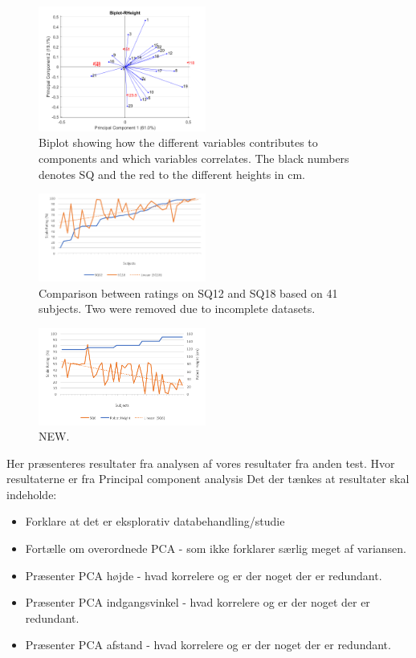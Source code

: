 \noindent
%
%
\begin{figure}[H]
	\centering
	\includegraphics[width = 0.49\textwidth]{Figure/RHeight-Biplot.png}
	\setlength{} 
	\caption{Biplot showing how the different variables contributes to components and which variables correlates. The black numbers denotes SQ and the red to the different heights in cm.}
	\label{fig:biplot}
\end{figure}
\noindent
%
%
\begin{figure}[H]
	\centering
	\includegraphics[width = 0.49\textwidth]{Figure/SQ12+SQ18}
	\setlength{} 
	\caption{Comparison between ratings on SQ12 and SQ18 based on 41 subjects. Two were removed due to incomplete datasets.}
	\label{fig:SQ12+SQ18}
\end{figure}
\noindent
%
%
\begin{figure}[H]
	\centering
	\includegraphics[width = 0.49\textwidth]{Figure/HeightSQ6}
	\setlength{} 
	\caption{NEW.}
	\label{fig:HeightSQ6}
\end{figure}
\noindent
%


{\color{red} Her præsenteres resultater fra analysen af vores resultater fra anden test. Hvor resultaterne er fra Principal component analysis}
%
Det der tænkes at resultater skal indeholde: 
\begin{itemize}
	\item Forklare at det er eksplorativ databehandling/studie
	\item Fortælle om overordnede PCA - som ikke forklarer særlig meget af variansen.
	\item Præsenter PCA højde - hvad korrelere og er der noget der er redundant.
	\item Præsenter PCA indgangsvinkel - hvad korrelere og er der noget der er redundant.
	\item Præsenter PCA afstand - hvad korrelere og er der noget der er redundant.
\end{itemize}